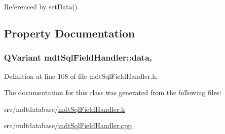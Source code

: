 Referenced by set\-Data().



\subsection{Property Documentation}
\hypertarget{classmdt_sql_field_handler_a87e0184853f31ac3236a6b05179192c8}{
\subsubsection[{data}]{\setlength{\rightskip}{0pt plus 5cm}Q\-Variant mdt\-Sql\-Field\-Handler\-::data\hspace{0.3cm}{\ttfamily [read]}, {\ttfamily [write]}}}\label{classmdt_sql_field_handler_a87e0184853f31ac3236a6b05179192c8}


Definition at line 108 of file mdt\-Sql\-Field\-Handler.\-h.



The documentation for this class was generated from the following files\-:\begin{DoxyCompactItemize}
\item 
src/mdtdatabase/\hyperlink{mdt_sql_field_handler_8h}{mdt\-Sql\-Field\-Handler.\-h}\item 
src/mdtdatabase/\hyperlink{mdt_sql_field_handler_8cpp}{mdt\-Sql\-Field\-Handler.\-cpp}\end{DoxyCompactItemize}
